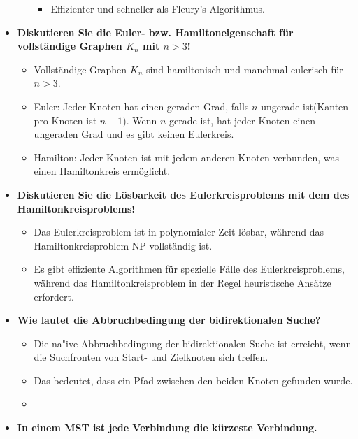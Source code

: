 \documentclass[12pt]{scrartcl}
\begin{document}
\begin{itemize}
\begin{itemize}
\begin{itemize}
                        \item Effizienter und schneller als Fleury's Algorithmus.
                    \end{itemize}
          \end{itemize}
    \item \textbf{Diskutieren Sie die Euler- bzw. Hamiltoneigenschaft für vollständige Graphen $K_n$ mit $n > 3$!}
          \begin{itemize}
              \item Vollständige Graphen $K_n$ sind hamiltonisch und manchmal eulerisch für $n > 3$.
              \item Euler: Jeder Knoten hat einen geraden Grad, falls $n$ ungerade ist(Kanten pro Knoten ist $n-1$).
                    Wenn $n$ gerade ist, hat jeder Knoten einen ungeraden Grad und es gibt keinen Eulerkreis.
              \item Hamilton: Jeder Knoten ist mit jedem anderen Knoten verbunden, was einen Hamiltonkreis ermöglicht.
          \end{itemize}
          \pagebreak
    \item \textbf{Diskutieren Sie die Lösbarkeit des Eulerkreisproblems mit dem des Hamiltonkreisproblems!}
          \begin{itemize}
              \item Das Eulerkreisproblem ist in polynomialer Zeit lösbar, während das Hamiltonkreisproblem NP-vollständig ist.
              \item Es gibt effiziente Algorithmen für spezielle Fälle des Eulerkreisproblems, während das Hamiltonkreisproblem in der Regel heuristische Ansätze erfordert.
          \end{itemize}
    \item \textbf{Wie lautet die Abbruchbedingung der bidirektionalen Suche?}
          \begin{itemize}
              \item Die na"ive Abbruchbedingung der bidirektionalen Suche ist erreicht, wenn die Suchfronten von Start- und Zielknoten sich treffen.
              \item Das bedeutet, dass ein Pfad zwischen den beiden Knoten gefunden wurde.
              \item
          \end{itemize}
    \item \textbf{In einem MST ist jede Verbindung die kürzeste Verbindung.}
          \begin{itemize}

\end{itemize}
\end{itemize}
\end{document}
